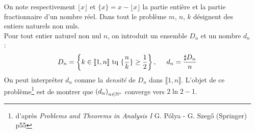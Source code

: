 On note respectivement $\lfloor x \rfloor$ et $\{x\}=x-\lfloor x \rfloor$ la partie entière et la partie fractionnaire d'un nombre réel. Dans tout le problème $m$, $n$, $k$ désignent des entiers naturels non nuls.\\
Pour tout entier naturel non nul $n$, on introduit un ensemble $D_n$ et un nombre $d_n$:
\begin{displaymath}
 D_n = \left\lbrace k\in \llbracket 1,n \rrbracket \text{ tq } \{\frac{n}{k}\}\geq \frac{1}{2}\right\rbrace, \hspace{0.5cm} d_n = \frac{\sharp D_n}{n}
\end{displaymath}
On peut interpréter $d_n$ comme la \emph{densité} de $D_n$ dans $\llbracket 1,n \rrbracket$.\newline
L'objet de ce problème\footnote{d'après \emph{Problems and Theorems in Analysis I} G. P\'olya - G. Szeg\H{o} (Springer)  p55} est de montrer que $\left( d_n\right) _{n\in \mathbb{N}^*}$ converge vers $2\ln 2 -1$.
